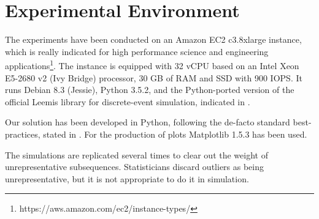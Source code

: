 \section{Experimental Environment}
\label{sec:experimental-analysis}

The experiments have been conducted on an Amazon EC2 c3.8xlarge instance, which is really indicated for high performance science and engineering applications\footnote{https://aws.amazon.com/ec2/instance-types/}. 
The instance is equipped with 32 vCPU based on an Intel Xeon E5-2680 v2 (Ivy Bridge) processor, 30 GB of RAM and SSD with 900 IOPS. 
It runs Debian 8.3 (Jessie), Python 3.5.2, and the Python-ported version of the official Leemis library for discrete-event simulation, indicated in \cite{leemis2006discrete}.

Our solution has been developed in Python, following the de-facto standard best-practices, stated in \cite{reitz2016,GooglePythonStyleguide}. For the production of plots Matplotlib 1.5.3 has been used.

The simulations are replicated several times to clear out the weight of unrepresentative subsequences.
Statisticians discard outliers as being unrepresentative, but it is not appropriate to do it in simulation.